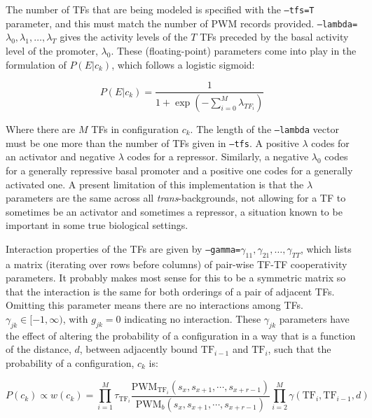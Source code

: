 \documentclass[11pt]{article}
\begin{document}
The number of TFs that are being modeled is specified with the \texttt{--tfs=T} parameter, and this must match the number of PWM records provided. \texttt{--lambda=}$\lambda_0,\lambda_1,\ldots,\lambda_{T}$ gives the activity levels of the $T$ TFs preceded by the basal activity level of the promoter, $\lambda_0$. These (floating-point) parameters come into play in the formulation of $P(E|c_k)$, which follows a logistic sigmoid:

\begin{displaymath}
P(E|c_k) = \frac{1}{1+\exp(-\sum_{i=0}^{M}\lambda_{TF_i})}
\end{displaymath}

\noindent Where there are $M$ TFs in configuration $c_k$. The length of the \texttt{--lambda} vector must be one more than the number of TFs given in \texttt{--tfs}. A positive $\lambda$ codes for an activator and negative $\lambda$ codes for a repressor. Similarly, a negative $\lambda_0$ codes for a generally repressive basal promoter and a positive one codes for a generally activated one. A present limitation of this implementation is that the $\lambda$ parameters are the same across all \emph{trans}-backgrounds, not allowing for a TF to sometimes be an activator and sometimes a repressor, a situation known to be important in some true biological settings.

Interaction properties of the TFs are given by \texttt{--gamma=}$\gamma_{11},\gamma_{21},\ldots,\gamma_{TT}$, which lists a matrix (iterating over rows before columns) of pair-wise TF-TF cooperativity parameters. It probably makes most sense for this to be a symmetric matrix so that the interaction is the same for both orderings of a pair of adjacent TFs. Omitting this parameter means there are no interactions among TFs. $\gamma_{jk} \in [-1,\infty)$, with $g_{jk} = 0$ indicating no interaction. These $\gamma_{jk}$ parameters have the effect of altering the probability of a configuration in a way that is a function of the distance, $d$, between adjacently bound $\mathrm{TF}_{i-1}$ and $\mathrm{TF}_i$, such that the probability of a configuration, $c_k$ is:

\begin{displaymath}
P(c_k) \propto w(c_k) =
\prod_{i=1}^{M}\tau_{\mathrm{TF}_{i}}\frac{\mathrm{PWM}_{\mathrm{TF}_{i}}(s_x,s_{x+1},\cdots,s_{x+r-1})}{\mathrm{PWM}_{b}(s_x,
 s_{x+1},\cdots,s_{x+r-1})}\prod_{i=2}^{M}\gamma(\mathrm{TF}_{i},\mathrm{TF}_{i-1},d)
\end{displaymath}
\end{document}
